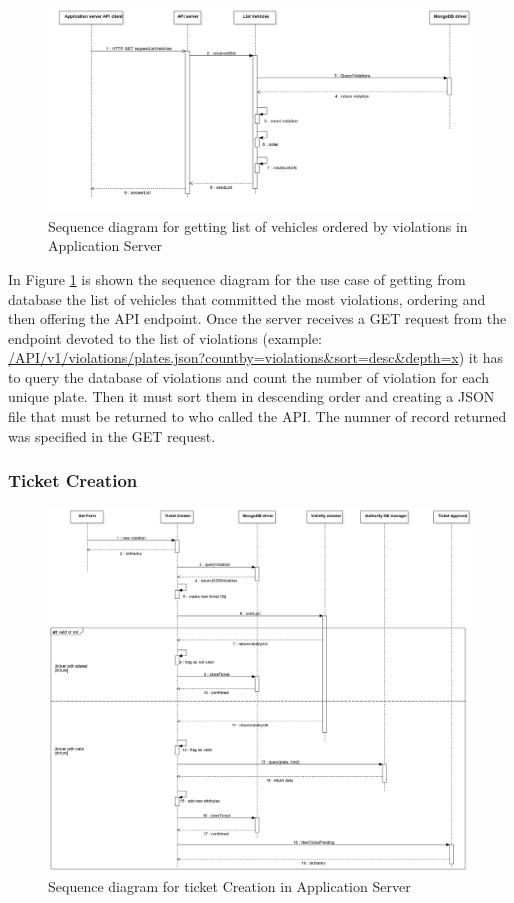 \begin{figure}[H]
\centering
\includegraphics[width=\textwidth]{Images/DDSeqSeverList.png}
\caption{\label{fig:DDSeqSeverList} Sequence diagram for getting list of vehicles ordered by violations in Application Server  }
\end{figure}
In Figure \ref{fig:DDSeqSeverList} is shown the sequence diagram for the use case of getting from database the list of vehicles that committed the most violations, ordering and then offering the API endpoint.
Once the server receives a GET request from the endpoint devoted to the list of violations (example: \url{/API/v1/violations/plates.json?countby=violations&sort=desc&depth=x}) it has to query the database of violations and count the number of violation for each unique plate. Then it must sort them in descending order and creating a JSON file that must be returned to who called the API. The numner of record returned was specified in the GET request.


\subsubsection{Ticket Creation}%
\begin{figure}[H]
\centering
\includegraphics[width=\textwidth]{Images/DDSeqSeverTickCreat.png}
\caption{\label{fig:DDSeqSeverTickCreat} Sequence diagram for ticket Creation in Application Server}
\end{figure}

